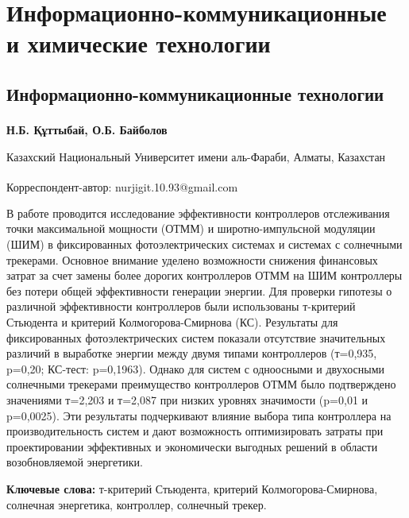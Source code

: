 \newpage
\let\cleardoublepage\clearpage
\part{Информационно-коммуникационные и химические технологии}
\chapter{Информационно-коммуникационные технологии}

\begin{articleheader}

{\bfseries
Н.Б. Құттыбай\textsuperscript{\envelope },
О.Б. Байболов
}
\end{articleheader}

\begin{affiliation}
Казахский Национальный Университет имени аль-Фараби, Алматы, Казахстан

\raggedright \textsuperscript{\envelope }Корреспондент-автор: nurjigit.10.93@gmail.com
\end{affiliation}

В работе проводится исследование эффективности контроллеров отслеживания
точки максимальной мощности (ОТММ) и широтно-импульсной модуляции (ШИМ)
в фиксированных фотоэлектрических системах и системах с солнечными
трекерами. Основное внимание уделено возможности снижения финансовых
затрат за счет замены более дорогих контроллеров ОТММ на ШИМ контроллеры
без потери общей эффективности генерации энергии. Для проверки гипотезы
о различной эффективности контроллеров были использованы т-критерий
Стьюдента и критерий Колмогорова-Смирнова (КС). Результаты для
фиксированных фотоэлектрических систем показали отсутствие значительных
различий в выработке энергии между двумя типами контроллеров (т=0,935,
p=0,20; КС-тест: p=0,1963). Однако для систем с одноосными и двухосными
солнечными трекерами преимущество контроллеров ОТММ было подтверждено
значениями т=2,203 и т=2,087 при низких уровнях значимости (p=0,01 и
p=0,0025). Эти результаты подчеркивают влияние выбора типа контроллера
на производительность систем и дают возможность оптимизировать затраты
при проектировании эффективных и экономически выгодных решений в области
возобновляемой энергетики.

{\bfseries Ключевые слова:} т-критерий Стьюдента, критерий
Колмогорова-Смирнова, солнечная энергетика, контроллер, солнечный
трекер.

